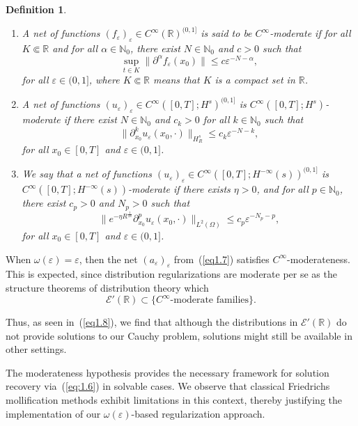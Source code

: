 \documentclass[12pt]{amsart}
\newtheorem{definition}[theorem]{Definition}
\theoremstyle{definition}
\begin{document}
\begin{definition}
\label{def-1.3-hip}
\begin{enumerate}
    \item[(i)] A net of functions $(f_\varepsilon)_\varepsilon \in C^\infty(\mathbb{R})^{(0,1]}$ is said to be $C^\infty$-moderate if for all $K \Subset \mathbb{R}$ and for all $\alpha \in \mathbb{N}_0$, there exist $N \in \mathbb{N}_0$ and $c > 0$ such that
    \[
    \sup_{t \in K} \| \partial^\alpha f_\varepsilon(x_0) \| \leq c \varepsilon^{-N-\alpha},
    \]
    for all $\varepsilon \in (0, 1]$, where $K \Subset \mathbb{R}$ means that $K$ is a compact set in $\mathbb{R}$.
    
    \item[(ii)] A net of functions $(u_\varepsilon)_\varepsilon \in C^\infty([0, T]; H^s)^{(0,1]}$ is $C^\infty([0, T]; H^s)$-moderate if there exist $N \in \mathbb{N}_0$ and $c_k > 0$ for all $k \in \mathbb{N}_0$ such that
    \[
    \| \partial_{x_0}^k u_\varepsilon(x_0, \cdot) \|_{H_R^s} \leq c_k \varepsilon^{-N-k},
    \]
    for all $x_0 \in [0, T]$ and $\varepsilon \in (0, 1]$.
    
    \item[(iii)] We say that a net of functions $(u_\varepsilon)_\varepsilon \in C^\infty([0, T]; H^{-\infty}(s))^{(0,1]}$ is $C^\infty([0, T]; H^{-\infty}(s))$-moderate if there exists $\eta > 0$, and for all $p \in \mathbb{N}_0$, there exist $c_p > 0$ and $N_p > 0$ such that
    \[
    \| e^{-\eta R^{\frac{1}{2s}}} \partial_{x_0}^p u_\varepsilon(x_0, \cdot) \|_{L^2(\Omega)} \leq c_p \varepsilon^{-N_p-p},
    \]
    for all $x_0 \in [0, T]$ and $\varepsilon \in (0, 1]$.
\end{enumerate}
\end{definition}
When $\omega(\varepsilon) = \varepsilon$, then the net $(a_\varepsilon)_\varepsilon$ from~(\ref{eq1.7}) satisfies $C^\infty$-moderateness. This is expected, since distribution regularizations are moderate  per se as the structure theorems of distribution theory which
\begin{equation}
\mathcal{E}'(\mathbb{R}) \subset \{ C^\infty\text{-moderate families} \}. \label{eq1.8}
\end{equation}

Thus, as seen in~(\ref{eq1.8}), we find that although the distributions in $\mathcal{E}'(\mathbb{R})$ do not provide solutions to our Cauchy problem, solutions might still be available in other settings.

The moderateness hypothesis provides the necessary framework for solution recovery via~(\ref{eq:1.6}) in solvable cases. We observe that classical Friedrichs mollification methods exhibit limitations in this context, thereby justifying the implementation of our $\omega(\varepsilon)$-based regularization approach.
\end{document}
